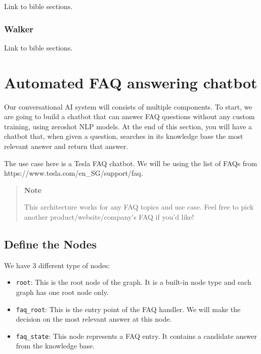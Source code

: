 Link to bible sections.

\subsubsection{Walker}\label{walker}

Link to bible sections.

\section{Automated FAQ answering
  chatbot}\label{automated-faq-answering-chatbot}

Our conversational AI system will consists of multiple components. To
start, we are going to build a chatbot that can answer FAQ questions
without any custom training, using zeroshot NLP models. At the end of
this section, you will have a chatbot that, when given a question,
searches in its knowledge base the most relevant answer and return that
answer.

The use case here is a Tesla FAQ chatbot. We will be using the list of
FAQs from https://www.tesla.com/en\_SG/support/faq.

\begin{quote}
    \textbf{Note}

    This architecture works for any FAQ topics and use case. Feel free to
    pick another product/website/company's FAQ if you'd like!
\end{quote}

\subsection{Define the Nodes}\label{define-the-nodes}

We have 3 different type of nodes:

\begin{itemize}
    \tightlist
    \item
          \texttt{root}: This is the root node of the graph. It is a built-in
          node type and each graph has one root node only.
    \item
          \texttt{faq\_root}: This is the entry point of the FAQ handler. We
          will make the decision on the most relevant answer at this node.
    \item
          \texttt{faq\_state}: This node represents a FAQ entry. It contains a
          candidate answer from the knowledge base.
\end{itemize}

